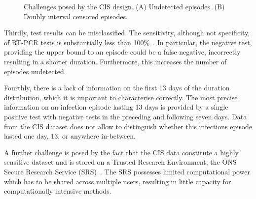 \documentclass[12pt]{article}
\begin{document}
\begin{figure}
  \caption{%
    Challenges posed by the CIS design.
    (A) Undetected episodes.
    (B) Doubly interval censored episodes.
  }
  \label{fig:challenges}
\end{figure}


Thirdly, test results can be misclassified.
The sensitivity, although not specificity, of RT-PCR tests is substantially less than 100\%~\citep{cisMethodsONS}.
In particular, the negative test, providing the upper bound to an episode could be a false negative, incorrectly resulting in a shorter duration.  Furthermore, this increases the number of episodes undetected.

Fourthly, there is a lack of information on the first 13 days of the duration distribution, which it is important to characterise correctly.
The most precise information on an infection episode lasting 13 days is provided by a single positive test with negative tests in the preceding and following seven days.
Data from the CIS dataset does not allow to distinguish whether this infections episode lasted one day, 13, or anywhere in-between.

A further challenge is posed by the fact that the CIS data constitute a highly sensitive dataset and is stored on a Trusted Research Environment, the ONS Secure Research Service (SRS)~\citep{onsSRS}.
The SRS possesses limited computational power which has to be shared across multiple users, resulting in little capacity for computationally intensive methods.


\end{document}
